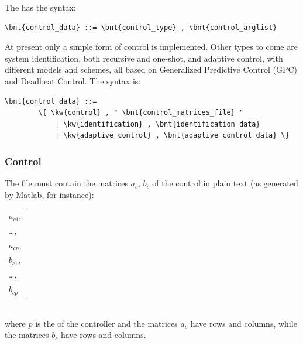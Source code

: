 The  has the syntax:
\begin{Verbatim}[commandchars=\\\{\}]
        \bnt{control_data} ::= \bnt{control_type} , \bnt{control_arglist}
\end{Verbatim}
At present only a simple form of control is implemented. Other types
to come are system identification, both recursive and one-shot, and
adaptive control, with different models and schemes, all based on 
Generalized Predictive Control (GPC) and Deadbeat Control.
The  syntax is:
\begin{Verbatim}[commandchars=\\\{\}]
    \bnt{control_data} ::=
        \{ \kw{control} , " \bnt{control_matrices_file} "
            | \kw{identification} , \bnt{identification_data}
            | \kw{adaptive control} , \bnt{adaptive_control_data} \}
\end{Verbatim}

\subsubsection{Control}
The file  must contain the matrices
$ a_c $, $ b_c $ of the control in plain text (as generated by Matlab, for
instance):

\noindent
\begin{tabular}{l}
    $ a_{c1} $, \\
    \ldots,     \\
    $ a_{cp} $, \\
    $ b_{c1} $, \\
    \ldots,     \\
    $ b_{cp} $  \\
\end{tabular} \\
where $ p $ is the  of the controller and the matrices $ a_c $
have  rows and  columns, while the
matrices $ b_c $ have  rows and  columns.

